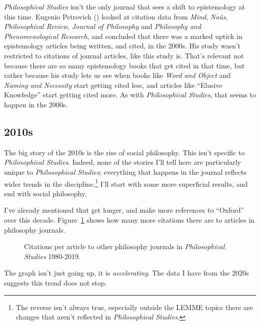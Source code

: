 \documentclass[
  10pt,
  letterpaper,
  DIV=11,
  numbers=noendperiod,
  twoside]{scrartcl}
\begin{document}
\emph{Philosophical Studies} isn't the only journal that sees a shift to
epistemology at this time. Eugenio Petrovich
() looked at citation data from
\emph{Mind}, \emph{Noûs}, \emph{Philosophical Review}, \emph{Journal of
Philosophy} and \emph{Philosophy and Phenomenological Research}, and
concluded that there was a marked uptick in epistemology articles being
written, and cited, in the 2000s. His study wasn't restricted to
citations of journal articles, like this study is. That's relevant not
because there are so many epistemology books that get cited in that
time, but rather because his study lets us see when books like
\emph{Word and Object} and \emph{Naming and Necessity} start getting
cited less, and articles like ``Elusive Knowledge'' start getting cited
more. As with \emph{Philosophical Studies}, that seems to happen in the
2000s.

\subsection{2010s}\label{sec-2010s-articles}

The big story of the 2010s is the rise of social philosophy. This isn't
specific to \emph{Philosophical Studies}. Indeed, none of the stories
I'll tell here are particularly unique to \emph{Philosophical Studies};
everything that happens in the journal reflects wider trends in the
discipline.\footnote{The reverse isn't always true, especially outside
  the LEMME topics there are changes that aren't reflected in
  \emph{Philosophical Studies}.} I'll start with some more superficial
results, and end with social philosophy.

I've already mentioned that get longer, and make more references to
``Oxford'' over this decade. Figure~\ref{fig-citations-by-year} shows
how many more citations there are to articles in philosophy journals.

\begin{figure}


\caption{\label{fig-citations-by-year}Citations per article to other
philosophy journals in \emph{Philosophical Studies} 1980-2019.}

\end{figure}%

The graph isn't just going up, it is \emph{accelerating}. The data I
have from the 2020s suggests this trend does not stop.
\end{document}
